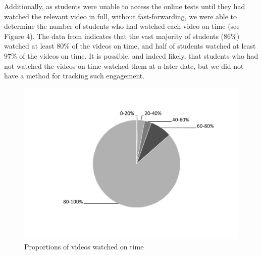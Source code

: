 \documentclass{amsart}
\begin{document}
Additionally, as students were unable to access the online tests until they had watched the relevant video in full, without fast-forwarding, we were able to determine the number of students who had watched each video on time (see Figure 4).  The data from indicates that the vast majority of students (86\%) watched at least $80\%$ of the videos on time, and half of students watched at least $97\%$ of the videos on time.  It is possible, and indeed likely, that students who had not watched the videos on time watched them at a later date, but we did not have a method for tracking such engagement.

\begin{center}
\begin{figure}[hbt]
\includegraphics[width=1\textwidth]{figure4.pdf}
\caption{Proportions of videos watched on time}
\end{figure}
\end{center}

\end{document}

